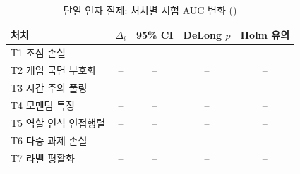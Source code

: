 \begin{table}[htbp]
  \centering
  \caption{단일 인자 절제: 처치별 시험 AUC 변화 ()}
  \label{tab:ablation}
  \small
  \begin{tabular}{@{}lcccc@{}}
    \toprule
    처치 & $\Delta_i$ & 95\% CI & DeLong $p$ & Holm 유의 \\
    \midrule
    T1 초점 손실 & -- & -- & -- & -- \\
    T2 게임 국면 부호화 & -- & -- & -- & -- \\
    T3 시간 주의 풀링 & -- & -- & -- & -- \\
    T4 모멘텀 특징 & -- & -- & -- & -- \\
    T5 역할 인식 인접행렬 & -- & -- & -- & -- \\
    T6 다중 과제 손실 & -- & -- & -- & -- \\
    T7 라벨 평활화 & -- & -- & -- & -- \\
    \bottomrule
  \end{tabular}
\end{table}
